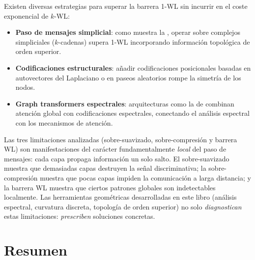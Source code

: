 Existen diversas estrategias para superar la barrera 1-WL sin incurrir en el coste
exponencial de $k$-WL:
\begin{itemize}
\item \textbf{Paso de mensajes simplicial}: como muestra la
, operar sobre complejos simpliciales
($k$-cadenas) supera 1-WL incorporando informaci\'on topol\'ogica de orden
superior.
\item \textbf{Codificaciones estructurales}: a\~nadir codificaciones posicionales
basadas en autovectores del Laplaciano o en paseos aleatorios rompe la simetr\'ia
de los nodos.
\item \textbf{Graph transformers espectrales}: arquitecturas como la de
\citet{kreuzer2021spectral} combinan atenci\'on global con codificaciones
espectrales, conectando el an\'alisis espectral con los mecanismos de atenci\'on.
\end{itemize}

Las tres limitaciones analizadas (sobre-suavizado, sobre-compresi\'on y barrera
WL) son manifestaciones del car\'acter fundamentalmente \emph{local} del paso de
mensajes: cada capa propaga informaci\'on un solo salto. El sobre-suavizado
muestra que demasiadas capas destruyen la se\~nal discriminativa; la
sobre-compresi\'on muestra que pocas capas impiden la comunicaci\'on a larga
distancia; y la barrera WL muestra que ciertos patrones globales son indetectables
localmente. Las herramientas geom\'etricas desarrolladas en este libro (an\'alisis
espectral, curvatura discreta, topolog\'ia de orden superior) no solo
\emph{diagnostican} estas limitaciones: \emph{prescriben} soluciones concretas.

\section{Resumen}
\label{sec:priors:summary}

